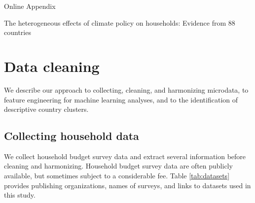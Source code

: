 \documentclass[12pt, a4paper]{article}
\begin{document}
\appendix 
\begin{refsection}
{\Huge Online Appendix} \label{sec:appendix}

The heterogeneous effects of climate policy on households: Evidence from 88 countries

\clearpage
\section{Data cleaning} \label{sec:cleaning}

We describe our approach to collecting, cleaning, and harmonizing microdata, to feature engineering for machine learning analyses, and to the identification of descriptive country clusters.

\subsection{Collecting household data}\label{sec:cleaning_1}

We collect household budget survey data and extract several information before cleaning and harmonizing. Household budget survey data are often publicly available, but sometimes subject to a considerable fee. Table \ref{tab:datasets} provides publishing organizations, names of surveys, and links to datasets used in this study.


\end{refsection}
\end{document}
